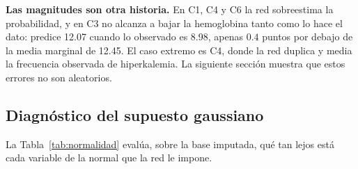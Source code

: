 \documentclass[11pt, a4paper]{article}
\begin{document}
\textbf{Las magnitudes son otra historia.} En C1, C4 y C6 la red sobreestima la probabilidad, y en
C3 no alcanza a bajar la hemoglobina tanto como lo hace el dato: predice 12.07 cuando lo observado
es 8.98, apenas $0.4$ puntos por debajo de la media marginal de 12.45. El caso extremo es C4, donde
la red duplica y media la frecuencia observada de hiperkalemia. La siguiente sección muestra que
estos errores no son aleatorios.

\subsection{Diagnóstico del supuesto gaussiano}

La Tabla~\ref{tab:normalidad} evalúa, sobre la base imputada, qué tan lejos está cada variable de
la normal que la red le impone.
\end{document}
